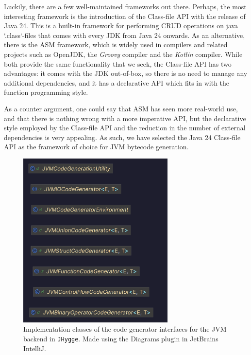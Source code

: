 Luckily, there are a few well-maintained frameworks out there. Perhaps, the most interesting framework is the introduction of the
Class-file API with the release of Java 24. This is a built-in framework for performing CRUD operations on java `.class`-files
that comes with every JDK from Java 24 onwards. As an alternative, there is the ASM framework, which is widely used in compilers
and related projects such as OpenJDK, the \textit{Groovy} compiler and the \textit{Kotlin} compiler. While both provide the
same functionality that we seek, the Class-file API has two advantages: it comes with the JDK out-of-box, so there is no
need to manage any additional dependencies, and it has a declarative API which fits in with the function programming style.

As a counter argument, one could say that ASM has seen more real-world use, and that there is nothing wrong with a more imperative
API, but the declarative style employed by the Class-file API and the reduction in the number of external dependencies is very
appealing. As such, we have selected the Java 24 Class-file API as the framework of choice for JVM bytecode generation.

\begin{figure}[H]
\centering
\includegraphics[width=0.7\textwidth]{Pictures/Diagrams/jvm_codegenerator_classes.png}
\caption{Implementation classes of the code generator interfaces for the JVM backend in \texttt{JHygge}. Made using the Diagrams plugin in JetBrains IntelliJ.}
\label{fig:jvm_codegenerator_classes}
\end{figure}


